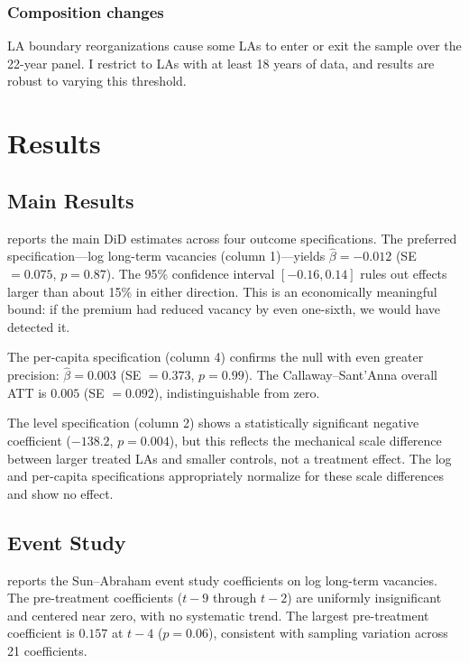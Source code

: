 \documentclass[12pt]{article}
\begin{document}
\subsubsection*{Composition changes} LA boundary reorganizations cause some LAs to enter or exit the sample over the 22-year panel. I restrict to LAs with at least 18 years of data, and results are robust to varying this threshold.

\section{Results}
\label{sec:results}

\subsection{Main Results}



 reports the main DiD estimates across four outcome specifications. The preferred specification---log long-term vacancies (column 1)---yields $\hat{\beta} = -0.012$ (SE $= 0.075$, $p = 0.87$). The 95\% confidence interval $[-0.16, 0.14]$ rules out effects larger than about 15\% in either direction. This is an economically meaningful bound: if the premium had reduced vacancy by even one-sixth, we would have detected it.

The per-capita specification (column 4) confirms the null with even greater precision: $\hat{\beta} = 0.003$ (SE $= 0.373$, $p = 0.99$). The Callaway--Sant'Anna overall ATT is $0.005$ (SE $= 0.092$), indistinguishable from zero.

The level specification (column 2) shows a statistically significant negative coefficient ($-138.2$, $p = 0.004$), but this reflects the mechanical scale difference between larger treated LAs and smaller controls, not a treatment effect. The log and per-capita specifications appropriately normalize for these scale differences and show no effect.

\subsection{Event Study}



 reports the Sun--Abraham event study coefficients on log long-term vacancies. The pre-treatment coefficients ($t - 9$ through $t - 2$) are uniformly insignificant and centered near zero, with no systematic trend. The largest pre-treatment coefficient is $0.157$ at $t - 4$ ($p = 0.06$), consistent with sampling variation across 21 coefficients.
\end{document}
